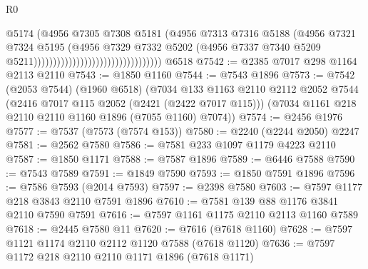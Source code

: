 \begin{lexlean}{R0}
\begin{coremodule}
                                                            @5174
                                                            (@4956
                                                              @7305
                                                              @7308
                                                              @5181
                                                              (@4956
                                                                @7313
                                                                @7316
                                                                @5188
                                                                (@4956
                                                                  @7321
                                                                  @7324
                                                                  @5195
                                                                  (@4956
                                                                    @7329
                                                                    @7332
                                                                    @5202
                                                                    (@4956
                                                                      @7337
                                                                      @7340
                                                                      @5209
                                                                      @5211)))))))))))))))))))))))))))))))))
    @6518
@7542 := @2385 @7017 @298 @1164 @2113 @2110
@7543 := @1850 @1160
@7544 := @7543 @1896
@7573 := @7542
    (@2053 @7544)
    (@1960 @6518)
    (@7034
      @133
      @1163
      @2110
      @2112
      @2052
      @7544
      (@2416 @7017 @115 @2052 (@2421 (@2422 @7017 @115)))
      (@7034 @1161 @218 @2110 @2110 @1160 @1896 (@7055 @1160) @7074))
@7574 := @2456 @1976
@7577 := @7537 (@7573 (@7574 @153))
@7580 := @2240 (@2244 @2050) @2247
@7581 := @2562 @7580
@7586 := @7581 @233 @1097 @1179 @4223 @2110
@7587 := @1850 @1171
@7588 := @7587 @1896
@7589 := @6446 @7588
@7590 := @7543 @7589
@7591 := @1849 @7590
@7593 := @1850 @7591 @1896
@7596 := @7586 @7593 (@2014 @7593)
@7597 := @2398 @7580
@7603 := @7597 @1177 @218 @3843 @2110 @7591 @1896
@7610 := @7581 @139 @88 @1176 @3841 @2110 @7590 @7591
@7616 := @7597 @1161 @1175 @2110 @2113 @1160 @7589
@7618 := @2445 @7580 @11
@7620 := @7616 (@7618 @1160)
@7628 := @7597 @1121 @1174 @2110 @2112 @1120 @7588 (@7618 @1120)
@7636 := @7597 @1172 @218 @2110 @2110 @1171 @1896 (@7618 @1171)

\end{coremodule}
\end{lexlean}
